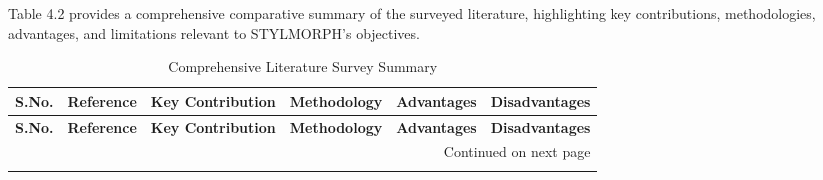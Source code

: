 \documentclass[12pt,a4paper,oneside]{report}
\begin{document}
Table 4.2 provides a comprehensive comparative summary of the surveyed literature, highlighting key contributions, methodologies, advantages, and limitations relevant to STYLMORPH's objectives.

\begin{center}
\vspace{-\baselineskip} %
\hspace{-0.7cm} %
\small %
\begin{longtable}{|p{0.1cm}|p{1.9cm}|p{2.0cm}|p{2.0cm}|p{2.0cm}|p{2.0cm}|}
\caption{Comprehensive Literature Survey Summary}
\label{tab:literature-summary}\\
\hline
\textbf{S.No.} & \textbf{Reference} & \textbf{Key Contribution} & \textbf{Methodology} & \textbf{Advantages} & \textbf{Disadvantages} \\
\hline
\endfirsthead

\hline
\textbf{S.No.} & \textbf{Reference} & \textbf{Key Contribution} & \textbf{Methodology} & \textbf{Advantages} & \textbf{Disadvantages} \\
\hline
\endhead

\hline
\multicolumn{6}{r}{\small{Continued on next page}} \\
\endfoot

\hline
\endlastfoot


\end{longtable}
\end{center}
\end{document}
